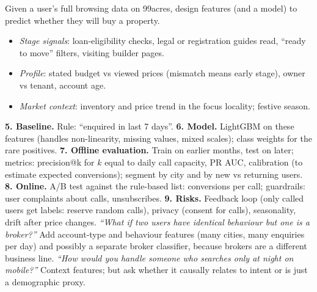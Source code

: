 \begin{qa}{ Given a user's full browsing data on 99acres, design features (and a model) to predict whether they will buy a property.}
\begin{itemize}
\item \emph{Stage signals}: loan-eligibility checks, legal or registration guides read, ``ready to move'' filters, visiting builder pages.
\item \emph{Profile}: stated budget vs viewed prices (mismatch means early stage), owner vs tenant, account age.
\item \emph{Market context}: inventory and price trend in the focus locality; festive season.
\end{itemize}
\textbf{5. Baseline.} Rule: ``enquired in last 7 days''. \textbf{6. Model.} LightGBM on these features (handles non-linearity, missing values, mixed scales); class weights for
the rare positives. \textbf{7. Offline evaluation.} Train on earlier months, test on later; metrics: precision@k for $k$ equal to daily call capacity, PR AUC, calibration (to estimate
expected conversions); segment by city and by new vs returning users.
\textbf{8. Online.} A/B test against the rule-based list: conversions per call; guardrails: user complaints about calls, unsubscribes. \textbf{9. Risks.} Feedback loop (only called
users get labels: reserve random calls), privacy (consent for calls), seasonality, drift after price changes.
\pushes \emph{``What if two users have identical behaviour but one is a broker?''} Add account-type and behaviour features (many cities, many enquiries per day) and possibly a separate
broker classifier, because brokers are a different business line. \emph{``How would you handle someone who searches only at night on mobile?''} Context features; but ask whether it
causally relates to intent or is just a demographic proxy.
\end{qa}

